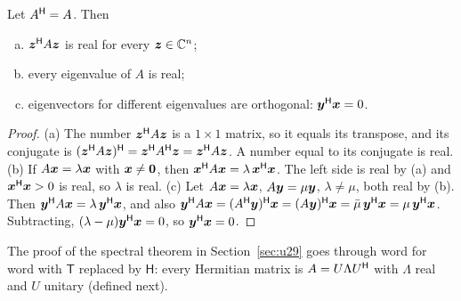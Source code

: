 \begin{theorem}\label{thm:u30-hermitian}
Let $A^{\mathsf{H}}=A$. Then
\begin{enumerate}[(a)]
  \item $\boldsymbol{z}^{\mathsf{H}} A\boldsymbol{z}$ is real for every $\boldsymbol{z}\in\mathbb{C}^n$;
  \item every eigenvalue of $A$ is real;
  \item eigenvectors for different eigenvalues are orthogonal: $\boldsymbol{y}^{\mathsf{H}}\boldsymbol{x}=0$.
\end{enumerate}
\end{theorem}
\begin{proof}
(a) The number $\boldsymbol{z}^{\mathsf{H}} A\boldsymbol{z}$ is a $1\times1$ matrix, so it equals its transpose, and its
conjugate is $(\boldsymbol{z}^{\mathsf{H}} A\boldsymbol{z})^{\mathsf{H}}=\boldsymbol{z}^{\mathsf{H}} A^{\mathsf{H}}\boldsymbol{z}=\boldsymbol{z}^{\mathsf{H}} A\boldsymbol{z}$. A number equal to its conjugate
is real.
(b) If $A\boldsymbol{x}=\lambda\boldsymbol{x}$ with $\boldsymbol{x}\ne\boldsymbol{0}$, then $\boldsymbol{x}^{\mathsf{H}} A\boldsymbol{x}=\lambda\,\boldsymbol{x}^{\mathsf{H}}\boldsymbol{x}$. The left side
is real by (a) and $\boldsymbol{x}^{\mathsf{H}}\boldsymbol{x}>0$ is real, so $\lambda$ is real.
(c) Let $A\boldsymbol{x}=\lambda\boldsymbol{x}$, $A\boldsymbol{y}=\mu\boldsymbol{y}$, $\lambda\ne\mu$, both real by (b). Then
$\boldsymbol{y}^{\mathsf{H}} A\boldsymbol{x}=\lambda\,\boldsymbol{y}^{\mathsf{H}}\boldsymbol{x}$, and also
$\boldsymbol{y}^{\mathsf{H}} A\boldsymbol{x}=(A^{\mathsf{H}}\boldsymbol{y})^{\mathsf{H}}\boldsymbol{x}=(A\boldsymbol{y})^{\mathsf{H}}\boldsymbol{x}=\bar\mu\,\boldsymbol{y}^{\mathsf{H}}\boldsymbol{x}=\mu\,\boldsymbol{y}^{\mathsf{H}}\boldsymbol{x}$.
Subtracting, $(\lambda-\mu)\boldsymbol{y}^{\mathsf{H}}\boldsymbol{x}=0$, so $\boldsymbol{y}^{\mathsf{H}}\boldsymbol{x}=0$.
\end{proof}

The proof of the spectral theorem in Section~\ref{sec:u29} goes through word for word
with $\mathsf{T}$ replaced by $\mathsf{H}$: every Hermitian matrix is $A=U\Lambda U^{\mathsf{H}}$ with $\Lambda$
real and $U$ unitary (defined next).

